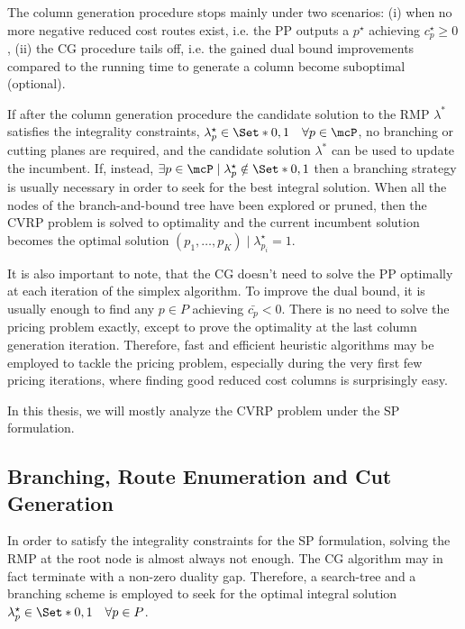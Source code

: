 The column generation procedure stops mainly under two scenarios:
(i) when no more negative reduced cost routes exist,
i.e. the PP outputs a $p^\star$ achieving $c^\star_p \ge 0$,
(ii) the CG procedure tails off,
i.e. the gained dual bound improvements
compared to the running time to generate a column
become suboptimal (optional).

If after the column generation procedure
the candidate solution to the RMP $\lambda^*$ satisfies the integrality constraints,
$\lambda^\star_p \in \Set*{0, 1} \quad \forall p \in \mcP$,
no branching or cutting planes are required,
and the candidate solution $\lambda^*$ can be used to update the incumbent.
If, instead,
$\exists p \in \mcP \mid \lambda^\star_p \notin \Set*{0, 1}$
then a branching strategy is usually necessary
in order to seek for the best integral solution.
When all the nodes of the branch-and-bound tree have been explored or pruned,
then the CVRP problem is solved to optimality
and the current incumbent solution becomes the optimal solution
$(p_1, \dots, p_K) \mid \lambda^\star_{p_i} = 1$.

\medskip

It is also important to note,
that the CG doesn't need to solve the PP optimally at each iteration of the simplex algorithm.
To improve the dual bound,
it is usually enough to find any $p \in P$ achieving $\bar{c_p} < 0$.
There is no need to solve the pricing problem exactly,
except to prove the optimality at the last column generation iteration.
Therefore, fast and efficient heuristic algorithms may be employed
to tackle the pricing problem,
especially during the very first few pricing iterations,
where finding good reduced cost columns is surprisingly easy.

\medskip

In this thesis, we will mostly analyze the CVRP problem under the SP formulation.

\subsection{Branching, Route Enumeration and Cut Generation}
\label{sec:intro-branching-and-cut-generation-within-bap-frameworks}

In order to satisfy the integrality constraints for the SP formulation,
solving the RMP at the root node is almost always not enough.
The CG algorithm may in fact terminate with a non-zero duality gap.
Therefore,
a search-tree and a branching scheme is employed
to seek for the optimal integral solution $\lambda^\star_p \in \Set*{0, 1} \quad \forall p \in P$.

